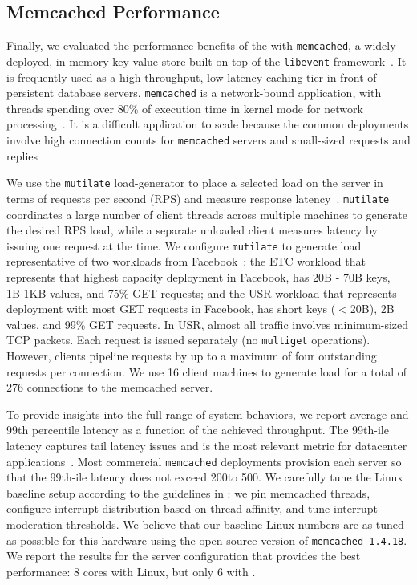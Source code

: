 
\subsection{Memcached Performance}
\label{sec:eval:memcached}




Finally, we evaluated the performance benefits of the \ix with
\texttt{memcached}, a widely deployed, in-memory key-value store built
on top of the \texttt{libevent} framework~\cite{url:memcached}. It is
frequently used as a high-throughput, low-latency caching tier in
front of persistent database servers. \texttt{memcached} is a
network-bound application, with threads spending over 80\% of
execution time in kernel mode for network
processing~\cite{DBLP:conf/eurosys/LeverichK14}. It is a difficult
application to scale because the common deployments involve high
connection counts for \texttt{memcached} servers and small-sized
requests and
replies~\cite{DBLP:conf/nsdi/NishtalaFGKLLMPPSSTV13,Atikoglu:2012:WAL}

We use the \texttt{mutilate} load-generator to place a selected load
on the server in terms of requests per second (RPS) and measure
response latency~\cite{url:mutilate}. \texttt{mutilate} coordinates a
large number of client threads across multiple machines to generate
the desired RPS load, while a separate unloaded client measures
latency by issuing one request at the time.  We configure
\texttt{mutilate} to generate load representative of two workloads
from Facebook~\cite{Atikoglu:2012:WAL}: the ETC workload that
represents that highest capacity deployment in Facebook, has 20B - 70B
keys, 1B-1KB values, and 75\% GET requests; and the USR workload that
represents deployment with most GET requests in Facebook, has short
keys ($<$20B), 2B values, and 99\% GET requests. In USR, almost all
traffic involves minimum-sized TCP packets. Each request is issued
separately (no \texttt{multiget} operations). However, clients
pipeline requests by up to a maximum of four outstanding requests per
connection. We use 16 client machines to generate load for a total of
276 connections to the memcached server.

To provide insights into the full range of system behaviors, we report
average and 99th percentile latency as a function of the achieved
throughput. The 99th-ile latency captures tail latency issues and is
the most relevant metric for datacenter
applications~\cite{DBLP:journals/cacm/DeanB13}. Most commercial
\texttt{memcached} deployments provision each server so that the
99th-ile latency does not exceed 200\microsecond to 500\microsecond.
We carefully tune the Linux baseline setup according to the guidelines
in \cite{DBLP:conf/eurosys/LeverichK14}: we pin memcached threads,
configure interrupt-distribution based on thread-affinity, and tune
interrupt moderation thresholds. We believe that our baseline Linux
numbers are as tuned as possible for this hardware using the
open-source version of \texttt{memcached-1.4.18}. We report the
results for the server configuration that provides the best
performance: 8 cores with Linux, but only 6 with \ix.

